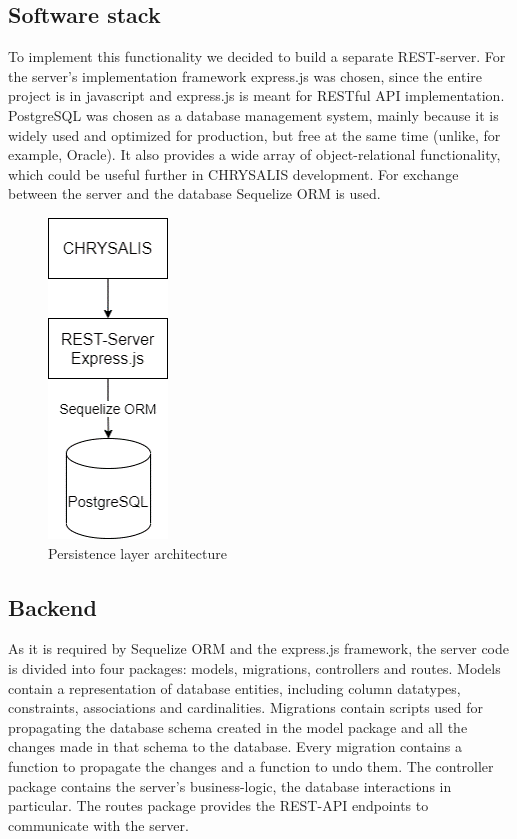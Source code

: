 \subsection{Software stack}
\label{sec:impr:persistence:stack}

To implement this functionality we decided to build a separate REST-server. For the server's implementation framework express.js was chosen, since the entire project is in javascript and express.js is meant for RESTful API implementation. PostgreSQL was chosen as a database management system, mainly because it is widely used and optimized for production, but free at the same time (unlike, for example, Oracle). It also provides a wide array of object-relational functionality, which could be useful further in CHRYSALIS development. For exchange between the server and the database Sequelize ORM is used.

\begin{figure}[hbt]
	\centering
	\includegraphics[width=.3\textwidth]{gfx/persistence_architecture}
	\caption{Persistence layer architecture}
	\label{fig:impr:persistence:architecture}
\end{figure}

\subsection{Backend}
\label{sec:impr:persistence:backend}

As it is required by Sequelize ORM and the express.js framework, the server code is divided into four packages: models, migrations, controllers and routes. Models contain a representation of database entities, including column datatypes, constraints, associations and cardinalities. Migrations contain scripts used for propagating the database schema created in the model package and all the changes made in that schema to the database. Every migration contains a function to propagate the changes and a function to undo them. The controller package contains the server's business-logic, the database interactions in particular. The routes package provides the REST-API endpoints to communicate with the server.
 
